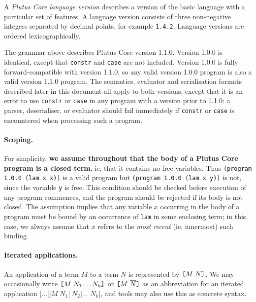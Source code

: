 A \textit{Plutus Core language version} describes a version of
the basic language with a particular set of features. A language version
consists of three non-negative integers separated by decimal points, for
example \texttt{1.4.2}. Language versions are ordered lexicographically.

The grammar above describes Plutus Core version 1.1.0. Version 1.0.0
is identical, except that \texttt{constr}
and \texttt{case} are not included.  Version 1.0.0 is fully forward-compatible
with version 1.1.0, so any valid version 1.0.0 program is also a valid version
1.1.0 program.  The semantics, evaluator and serialisation formats described
later in this document all apply to both versions, except that it is an error to
use \texttt{constr} or \texttt{case} in any program with a version prior to
1.1.0: a parser, deserialiser, or evaluator should fail immediately if
\texttt{constr} or \texttt{case} is encountered when processing such a program.

\paragraph{Scoping.} For simplicity, \textbf{we assume throughout that the body of a
Plutus Core program is a closed term}, ie, that it contains no free variables.
Thus \texttt{(program 1.0.0 (lam x x))} is a valid program but \texttt{(program
  1.0.0 (lam x y))} is not, since the variable \texttt{y} is free. This
condition should be checked before execution of any program commences, and the
program should be rejected if its body is not closed.  The assumption implies
that any variable $x$ occurring in the body of a program must be bound by an
occurrence of \texttt{lam} in some enclosing term; in this case, we always
assume that $x$ refers to the \textit{most recent} (ie, innermost) such binding.

\paragraph{Iterated applications.}
An application of a term $M$ to a term $N$ is represented by
$\texttt{[} M ~ N \texttt{]}$. We may occasionally write
$\texttt{[} M ~ N_1 \ldots N_k \texttt{]}$ or
$\texttt{[} M ~ \overline{N} \texttt{]}$ as an abbreviation for an iterated application
$\mathtt{[}\ldots\mathtt{[[}M\;N_1\mathtt{]}\;N_2\mathtt{]}\ldots $  %
  $N_k\mathtt{]}$,
and tools may also use this as concrete syntax.

